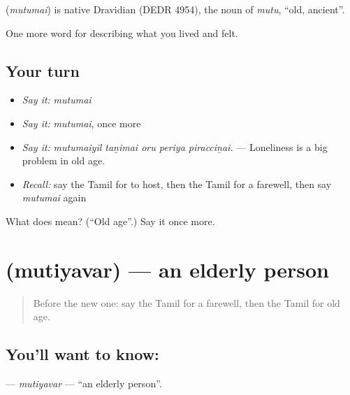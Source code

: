 \begin{cousinweb}
\textbf{} (\emph{mutumai}) is native Dravidian (DEDR 4954), the noun of  \emph{mutu}, \textquotedblleft{}old, ancient\textquotedblright{}.
\end{cousinweb}

\begin{grammarlens}[title={What you've built}]
One more word for describing what you lived and felt.
\end{grammarlens}

\subsection*{Your turn}
\begin{itemize}
\raggedright
  \item \emph{Say it:} \emph{mutumai}
  \item \emph{Say it:} \emph{mutumai}, once more
  \item \emph{Say it:} \emph{mutumaiyil taṉimai oru periya piracciṉai.} — Loneliness is a big problem in old age.
  \item \emph{Recall:} say the Tamil for to host, then the Tamil for a farewell, then say \emph{mutumai} again
\end{itemize}

\begin{tcolorbox}[breakable,colback=teal!4,colframe=teal!35!black,title={Before you move on}]
What does  mean? (\textquotedblleft{}Old age\textquotedblright{}.) Say it once more.
\end{tcolorbox}
\section[\texorpdfstring{\ta{முதியவர்} (mutiyavar)}{முதியவர் (mutiyavar)}]{ (mutiyavar) — an elderly person}

\label{lesson:TA-C504-mutiyavar}



\begin{quote}
Before the new one: say the Tamil for a farewell, then the Tamil for old age.
\end{quote}

\subsection*{You'll want to know: }
\textbf{} — \emph{mutiyavar} — \textquotedblleft{}an elderly person\textquotedblright{}.

